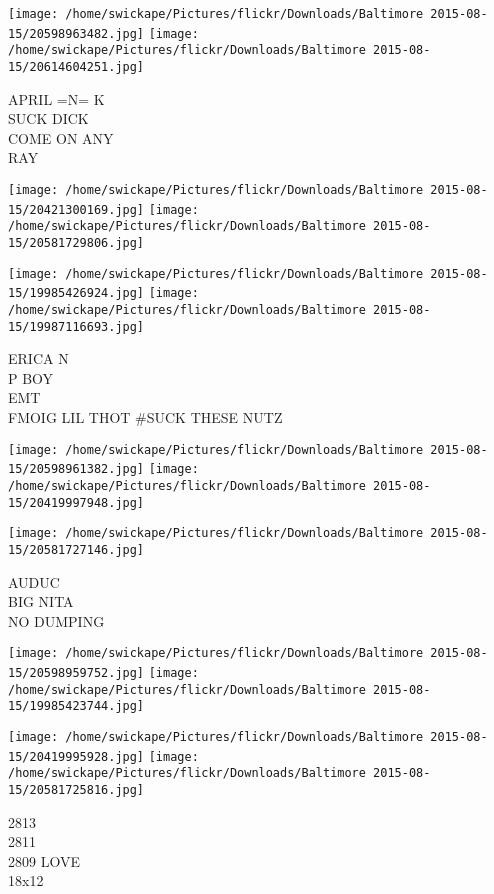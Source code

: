 \documentclass[10pt,letterpaper]{article}
\begin{document}
\texttt{[image: /home/swickape/Pictures/flickr/Downloads/Baltimore 2015-08-15/20598963482.jpg]}
\texttt{[image: /home/swickape/Pictures/flickr/Downloads/Baltimore 2015-08-15/20614604251.jpg]}

APRIL =N= K\\
SUCK DICK\\
COME ON ANY\\
RAY\\
\pagebreak

\texttt{[image: /home/swickape/Pictures/flickr/Downloads/Baltimore 2015-08-15/20421300169.jpg]}
\texttt{[image: /home/swickape/Pictures/flickr/Downloads/Baltimore 2015-08-15/20581729806.jpg]}

\texttt{[image: /home/swickape/Pictures/flickr/Downloads/Baltimore 2015-08-15/19985426924.jpg]}
\texttt{[image: /home/swickape/Pictures/flickr/Downloads/Baltimore 2015-08-15/19987116693.jpg]}

ERICA N\\
P BOY\\
EMT\\
FMOIG LIL THOT \#SUCK THESE NUTZ\\
\pagebreak

\texttt{[image: /home/swickape/Pictures/flickr/Downloads/Baltimore 2015-08-15/20598961382.jpg]}
\texttt{[image: /home/swickape/Pictures/flickr/Downloads/Baltimore 2015-08-15/20419997948.jpg]}

\vspace{0.25in}
\texttt{[image: /home/swickape/Pictures/flickr/Downloads/Baltimore 2015-08-15/20581727146.jpg]}

AUDUC\\
BIG NITA\\
NO DUMPING\\
\pagebreak

\texttt{[image: /home/swickape/Pictures/flickr/Downloads/Baltimore 2015-08-15/20598959752.jpg]}
\texttt{[image: /home/swickape/Pictures/flickr/Downloads/Baltimore 2015-08-15/19985423744.jpg]}

\texttt{[image: /home/swickape/Pictures/flickr/Downloads/Baltimore 2015-08-15/20419995928.jpg]}
\texttt{[image: /home/swickape/Pictures/flickr/Downloads/Baltimore 2015-08-15/20581725816.jpg]}

2813\\
2811\\
2809 LOVE\\
18x12\\
\pagebreak
\end{document}
